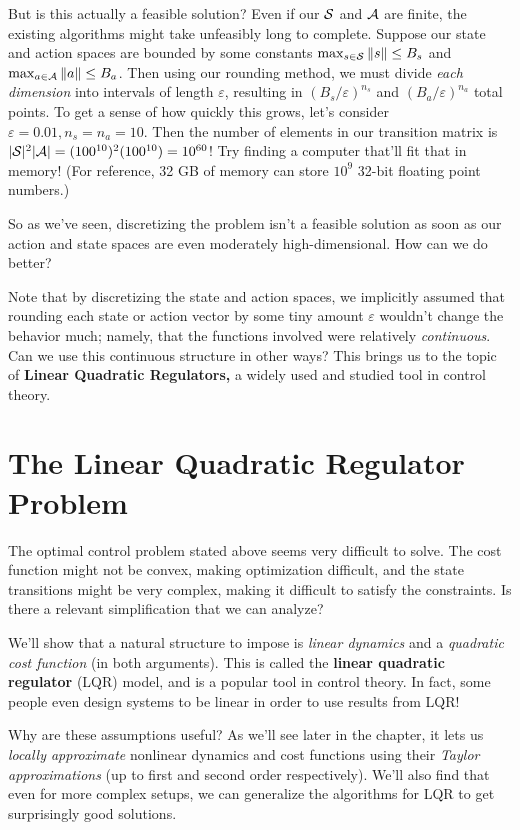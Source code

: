 \documentclass[../main/main]{subfiles}
\begin{document}
But is this actually a feasible solution? Even if our $\mathcal{S}$ and $\mathcal{A}$ are
finite, the existing algorithms might take unfeasibly long to complete.
Suppose our state and action spaces
are bounded by some constants $\max_{s \in \mathcal{S}} \|s\| \le B_s$ and
$\max_{a \in \mathcal{A}} \|a\| \le B_a$.
Then using our rounding method, we must divide \emph{each dimension} into intervals of length $\varepsilon$,
resulting in $(B_s/\varepsilon)^{n_s}$ and $(B_a/\varepsilon)^{n_a}$ total points.
To get a sense of how quickly this grows, let's consider $\varepsilon = 0.01, n_s = n_a = 10$. Then the number of elements in our transition matrix is $|\mathcal{S}|^2 |\mathcal{A}| = (100^{10})^2 (100^{10}) = 10^{60}$!
Try finding a computer that'll fit that in memory! (For reference, 32 GB of memory can store $10^9$ 32-bit floating point numbers.)

So as we've seen, discretizing the problem isn't a feasible solution as soon as
our action and state spaces are even moderately high-dimensional.
How can we do better?

Note that by discretizing the state and action spaces, we implicitly assumed that rounding each state or action vector by some tiny amount $\varepsilon$
wouldn't change the behavior much; namely, that the functions involved were relatively \emph{continuous}.
Can we use this continuous structure in other ways? This brings us to the topic of \textbf{Linear Quadratic Regulators,} a widely used and studied tool in control theory.

\section{The Linear Quadratic Regulator Problem} \label{sec:lqr}

The optimal control problem stated above seems very difficult to solve.
The cost function might not be convex, making optimization difficult,
and the state transitions might be very complex, making it difficult to satisfy the constraints.
Is there a relevant simplification that we can analyze?

We'll show that a natural structure to impose is \emph{linear dynamics} and a \emph{quadratic cost function} (in both arguments). This is called the \textbf{linear quadratic regulator} (LQR) model, and is a popular tool in control theory.
In fact, some people even design systems to be linear in order to use results from LQR!

Why are these assumptions useful? As we'll see later in the chapter, it lets us \emph{locally approximate} nonlinear dynamics and cost functions
using their \emph{Taylor approximations} (up to first and second order respectively).
We'll also find that even for more complex setups,
we can generalize the algorithms for LQR to get surprisingly good solutions.
\end{document}
